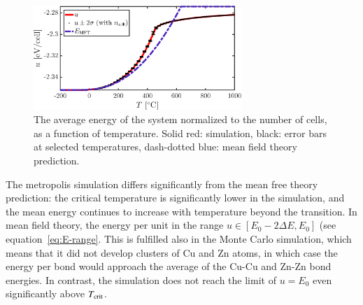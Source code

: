 \begin{figure}[!ht]
\begin{center}
  \includegraphics[width=0.7\textwidth]{../figures/U} 
  \caption{The average energy of the system normalized to the number of cells, as a function of temperature. Solid red: simulation, black: error bars at selected temperatures, dash-dotted blue: mean field theory prediction.}
  \label{fig:U}
\end{center}
\end{figure}

The metropolis simulation differs significantly from the mean free theory prediction: the critical temperature is significantly lower in the simulation, and the mean energy continues to increase with temperature beyond the transition. 
In mean field theory, the energy per unit  in the range $u \in [E_0 - 2 \Delta E,  E_0]$ (see equation~\eqref{eq:E-range}. This is fulfilled also in the Monte Carlo simulation, which means that it did not develop clusters of Cu and Zn atoms, in which case the energy per bond would approach the average of the Cu-Cu and Zn-Zn bond energies. In contrast, the simulation does not reach the limit of $u = E_0$ even significantly above $T_{\rm crit}$. 


